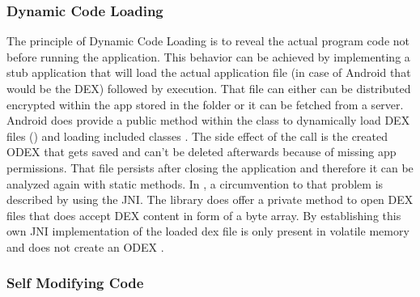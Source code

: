 \subsubsection{Dynamic Code Loading}
The principle of Dynamic Code Loading is to reveal the actual program code
not before running the application. This behavior can be achieved by
implementing a stub application that will load the actual application file
(in case of Android that would be the DEX) followed by execution.
That file can either can be distributed encrypted within the app stored
in the  folder or it can be fetched from a server.
Android does provide a public method within
the  class to dynamically load DEX files
()
and loading included classes \parencite{dexfileclass}. The side effect
of the  call is the created ODEX that gets saved and
can't be deleted afterwards because of missing app permissions.
That file persists after closing the application and therefore
it can be analyzed again with static methods. In \parencite{code_protection},
a circumvention to that problem is described by using the JNI.
The  library does offer a private method to open DEX files
that does accept DEX content in form of a byte array.
By establishing this own JNI implementation of
 the loaded dex file is only present
in volatile memory and does not create an ODEX \parencite{code_protection}.

\subsubsection{Self Modifying Code}

